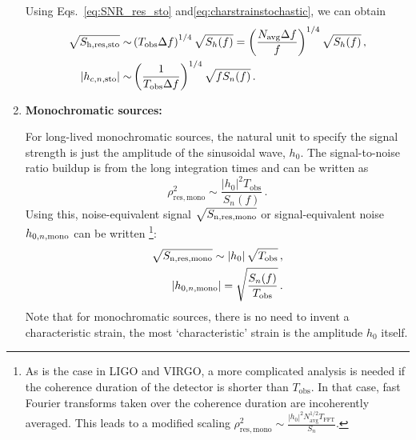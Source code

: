 \documentclass[11pt,a4paper]{article}
\begin{document}
\begin{enumerate}
		Using Eqs.~\eqref{eq:SNR_res_sto} and\eqref{eq:charstrainstochastic}, we can obtain
		\begin{subequations}
			\begin{align}
				\sqrt{S_\mathrm{h,res,sto}} \sim& \left(T_\mathrm{obs}  \Delta f\right)^{1/4} \sqrt{S_h(f)} 
				= \left( \frac{N_\mathrm{avg}\Delta f}{f}\right)^{1/4}\sqrt{S_h(f)}
				 \,, \\
				\left|h_{c,n,\rm sto}\right| \sim& \left(\frac{1}{T_\mathrm{obs}\Delta f }\right)^{1/4} \sqrt{f S_n(f)} 
\,.\label{eq:charnoisesto}
			\end{align}
		\end{subequations}
	\item \textbf{Monochromatic sources:}

	For long-lived monochromatic sources, the natural unit to specify the signal strength is just the amplitude of the sinusoidal wave, \(h_0\).
	The signal-to-noise ratio buildup is from the long integration times and can be written as
	\begin{equation}
		\rho^2_\mathrm{res,mono} \sim \frac{\left|h_0\right|^2 T_\mathrm{obs} }{S_n(f)} \label{eq:SNR_res_mono}\,.
	\end{equation}
	Using this, noise-equivalent signal \(\sqrt{S_\mathrm{n,res,\rm mono}}\) or signal-equivalent noise \(h_{0,n,\rm mono}\) can be written  \footnote{As is the case in LIGO and VIRGO, a more complicated analysis is needed if the coherence duration of the detector is shorter than $T_\mathrm{obs}$. In that case, fast Fourier transforms taken over the coherence duration are incoherently averaged. This leads to a modified scaling $\rho^2_\mathrm{res,mono}\sim \frac{ |h_0|^2N^{1/2}_\mathrm{avg} T_\mathrm{FFT}}{S_n}$\cite{Astone:2014method}.}:
	\begin{subequations}
		\begin{align}
			\sqrt{S_\mathrm{n,res,mono}} \sim \left|h_0\right|\sqrt{T_\mathrm{obs}} \,,\\
			\left|h_{0,n, \rm mono}\right| = \sqrt{\frac{S_n(f)}{T_\mathrm{obs}}} \,.
			\label{eq:h0mono}
		\end{align}
	\end{subequations}
	Note that for monochromatic sources, there is no need to invent a characteristic strain, the most `characteristic' strain is the amplitude \(h_0\) itself.
\end{enumerate}
\end{document}
